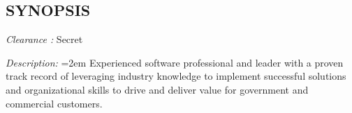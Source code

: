 \documentclass[12pt, line, margin]{res}
\begin{document}
    \begin{resume}

        \section{SYNOPSIS}
            {\sl Clearance :} Secret

            {\sl Description:}
              \hangindent=2em
              Experienced software professional and leader with a proven
              track record of leveraging industry knowledge to implement \newline
              successful solutions and organizational skills to drive and deliver
              value for government and commercial customers.


\end{resume}
\end{document}
